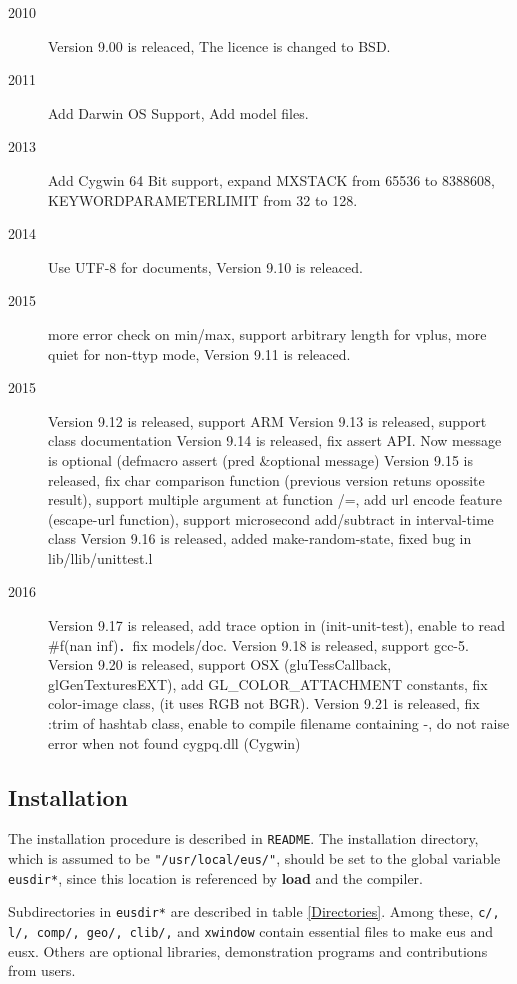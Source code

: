 \begin{description}
\item[2010] Version 9.00 is releaced, The licence is changed to BSD.
\item[2011] Add Darwin OS Support, Add model files.
\item[2013] Add Cygwin 64 Bit support, expand MXSTACK from 65536 to 8388608, KEYWORDPARAMETERLIMIT from 32 to 128.
\item[2014] Use UTF-8 for documents, Version 9.10 is releaced.
\item[2015] more error check on min/max, support arbitrary length for vplus, more quiet for non-ttyp mode, Version 9.11 is releaced.
\item[2015] Version 9.12 is released, support ARM
            Version 9.13 is released, support class documentation
            Version 9.14 is released, fix assert API. Now message is optional (defmacro assert (pred \&optional message)
            Version 9.15 is released, fix char comparison function (previous version retuns opossite result), support multiple argument at function /=,  add url encode feature (escape-url function), support microsecond add/subtract in interval-time class
            Version 9.16 is released, added make-random-state, fixed bug in lib/llib/unittest.l
\item[2016] Version 9.17 is released, add trace option in (init-unit-test), enable to read \#f(nan inf)．fix models/doc.
            Version 9.18 is released, support gcc-5.
            Version 9.20 is released, support OSX (gluTessCallback, glGenTexturesEXT), add GL\_COLOR\_ATTACHMENT constants, fix color-image class, (it uses RGB not BGR).
            Version 9.21 is released, fix :trim of hashtab class, enable to compile filename containing -, do not raise error when not found cygpq.dll (Cygwin)
\end{description}

\subsection{Installation}
The installation procedure is described in {\tt README}.
The installation directory, which is assumed to be {\tt "/usr/local/eus/"},
should be set to the global variable 
{\tt *eusdir*}, since this location is referenced
by {\bf load} and the compiler.

Subdirectories in  {\tt *eusdir*} are described in table \ref{Directories}.
Among these, 
{\tt c/, l/, comp/, geo/, clib/,} and {\tt xwindow} contain essential
files to make eus and eusx. Others are optional libraries, demonstration
programs and contributions from users.

